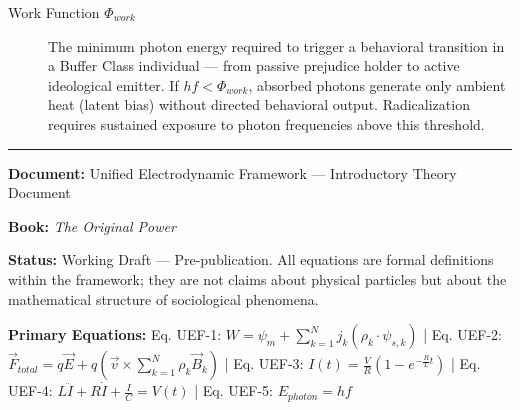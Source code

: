 \documentclass[12pt]{book}
\numberwithin{equation}{chapter}
\begin{document}
\begin{description}
\item[Work Function $\Phi_{work}$] 
The minimum photon energy required to trigger a behavioral transition in a Buffer Class individual — from passive prejudice holder to active ideological emitter. If $hf < \Phi_{work}$, absorbed photons generate only ambient heat (latent bias) without directed behavioral output. Radicalization requires sustained exposure to photon frequencies above this threshold.

\end{description}

\bigskip
\hrule
\bigskip

\textbf{Document:} Unified Electrodynamic Framework — Introductory Theory Document

\textbf{Book:} \emph{The Original Power}

\textbf{Status:} Working Draft — Pre-publication. All equations are formal definitions within the framework; they are not claims about physical particles but about the mathematical structure of sociological phenomena.

\textbf{Primary Equations:}
    Eq. UEF-1: $W = \psi_m + \sum_{k=1}^{N} j_k(\rho_k \cdot \psi_{s,k})$ |
    Eq. UEF-2: $\vec{F}_{total} = q\vec{E} + q\!\left(\vec{v} \times \sum_{k=1}^N \rho_k \vec{B}_k\right)$ |
    Eq. UEF-3: $I(t) = \frac{V}{R}(1 - e^{-\frac{R}{L}t})$ |
    Eq. UEF-4: $L\ddot{I} + R\dot{I} + \frac{I}{C} = V(t)$ |
    Eq. UEF-5: $E_{photon} = hf$
  
\end{document}
